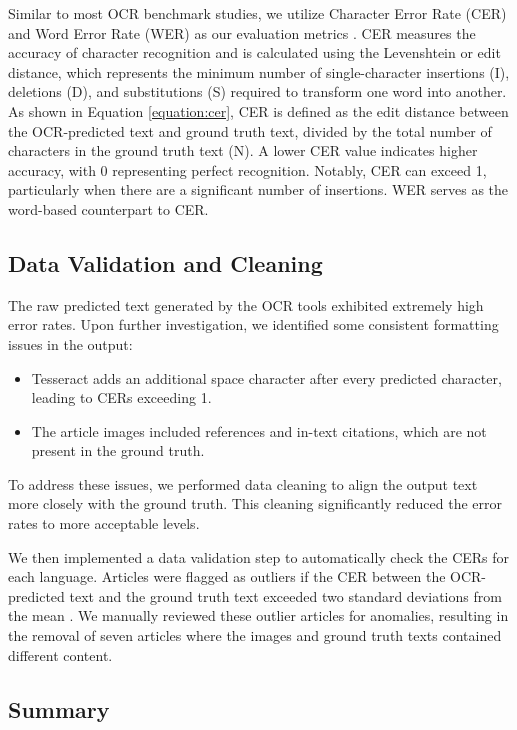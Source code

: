\documentclass[12pt,oneside]{memoir}
\begin{document}
Similar to most OCR benchmark studies, we utilize Character Error Rate (CER) and 
Word Error Rate (WER) as our evaluation metrics \parencite{hegghammer-2022, ignat-etal-2022}. CER measures the accuracy of 
character recognition and is calculated using the Levenshtein or edit distance, 
which represents the minimum number of single-character insertions (I), deletions (D), 
and substitutions (S) required to transform one word into another. As shown in 
Equation \ref{equation:cer}, CER is defined as the edit distance between the 
OCR-predicted text and ground truth text, divided by the total number of characters 
in the ground truth text (N). A lower CER value indicates higher accuracy, with 
0 representing perfect recognition. Notably, CER can exceed 1, particularly when 
there are a significant number of insertions. WER serves as the word-based counterpart to CER.

\subsection{Data Validation and Cleaning}
The raw predicted text generated by the OCR tools exhibited extremely high error 
rates. Upon further investigation, we identified some consistent formatting issues 
in the output:

\begin{itemize}
    \item Tesseract adds an additional space character after every predicted character, leading to CERs exceeding 1.
    \item The article images included references and in-text citations, which are not present in the ground truth. 
\end{itemize}

To address these issues, we performed data cleaning to align the output text 
more closely with the ground truth. This cleaning significantly reduced the error 
rates to more acceptable levels.

We then implemented a data validation step to automatically check the CERs for 
each language. Articles were flagged as outliers if the CER between the OCR-predicted 
text and the ground truth text exceeded two standard deviations from the mean \parencite{cousineau-and-chartier-2010}. 
We manually reviewed these outlier articles for anomalies, resulting in the removal 
of seven articles where the images and ground truth texts contained different content.

\subsection{Summary}
\end{document}
